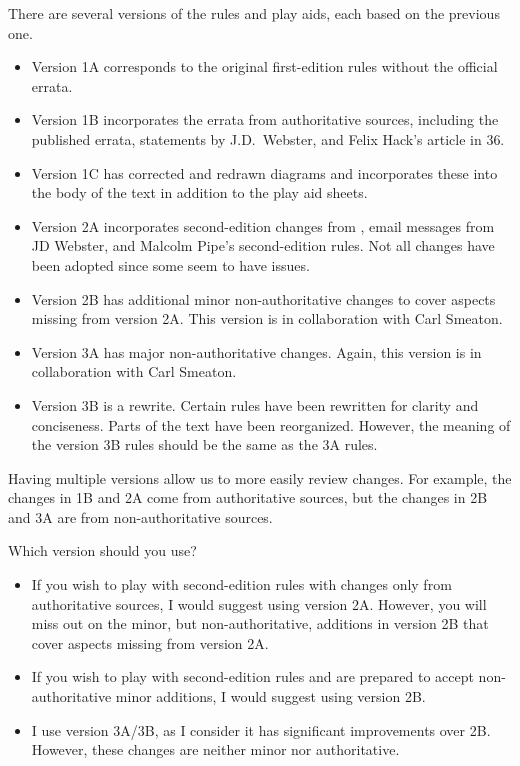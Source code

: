 \documentclass[10pt]{report}
\begin{document}
There are several versions of the rules and play aids, each based on the previous one. 

\begin{itemize}
    \item Version 1A corresponds to the original first-edition rules without the official errata.
    \item Version 1B incorporates the errata from authoritative sources, including the published errata, statements by J.D.\ Webster, and Felix Hack's article in {\APJ} 36.
    \item Version 1C has corrected and redrawn diagrams and incorporates these into the body of the text in addition to the play aid sheets.
    \item Version 2A incorporates second-edition changes from {\APJ}, email messages from JD Webster, and Malcolm Pipe's second-edition rules. Not all changes have been adopted since some seem to have issues.
    \item Version 2B has additional minor non-authoritative changes to cover aspects missing from version 2A. This version is in collaboration with Carl Smeaton.
    \item Version 3A has major non-authoritative changes. Again, this version is in collaboration with Carl Smeaton.
    \item Version 3B is a rewrite. Certain rules have been rewritten for clarity and conciseness. Parts of the text have been reorganized. However, the meaning of the version 3B rules should be the same as the 3A rules.
\end{itemize}

Having multiple versions allow us to more easily review changes. For example, the changes in 1B and 2A come from authoritative sources, but the changes in 2B and 3A are from non-authoritative sources.

Which version should you use?

\begin{itemize}
    \item If you wish to play with second-edition rules with changes only from authoritative sources, I would suggest using version 2A. However, you will miss out on the minor, but non-authoritative, additions in version 2B that cover aspects missing from version 2A.
    \item If you wish to play with second-edition rules and are prepared to accept non-authoritative minor additions, I would suggest using version 2B.
    \item I use version 3A/3B, as I consider it has significant improvements over 2B. However, these changes are neither minor nor authoritative.
\end{itemize}    
\end{document}
